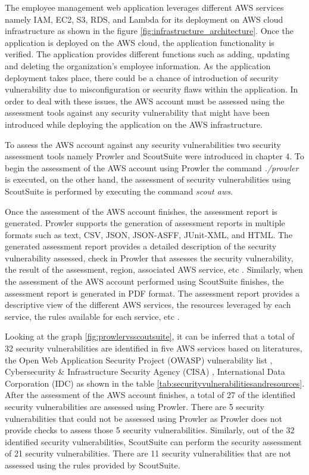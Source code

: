 \par The employee management web application \cite{69} leverages different AWS services namely IAM, EC2, S3, RDS, and Lambda for its deployment on AWS cloud infrastructure as shown in the figure \ref{fig:infrastructure_architecture}.
Once the application is deployed on the AWS cloud, the application functionality is verified.
The application provides different functions such as adding, updating and deleting the organization’s employee information.
As the application deployment takes place, there could be a chance of introduction of security vulnerability due to misconfiguration or security flaws within the application.
In order to deal with these issues, the AWS account must be assessed using the assessment tools against any security vulnerability that might have been introduced while deploying the application on the AWS infrastructure.

\par To assess the AWS account against any security vulnerabilities two security assessment tools namely Prowler and ScoutSuite were introduced in chapter 4.
To begin the assessment of the AWS account using Prowler the command \textit{./prowler} is executed, on the other hand, the assessment of security vulnerabilities using ScoutSuite is performed by executing the command \textit{scout aws}.

\par Once the assessment of the AWS account finishes, the assessment report is generated.
Prowler supports the generation of assessment reports in multiple formats such as text, CSV, JSON, JSON-ASFF, JUnit-XML, and HTML.
The generated assessment report provides a detailed 
description of the security vulnerability assessed, check
in Prowler that assesses the security vulnerability, the result of the assessment, region, associated AWS service, etc \cite{75}.
Similarly, when the assessment of the AWS account performed using ScoutSuite finishes, the assessment report is generated in PDF format.
The assessment report provides a descriptive view of the 
different AWS services, the resources leveraged by each 
service, the rules available for each service, etc \cite{76}.


\par \par Looking at the graph \ref{fig:prowlervsscoutsuite}, it can be inferred that a total of 32 security vulnerabilities are identified in five AWS services based on literatures, the Open Web Application Security Project (OWASP) vulnerability list \cite{43}, Cybersecurity \& Infrastructure Security Agency (CISA) \cite{42}, International Data Corporation (IDC) \cite{41} as shown in the table \ref{tab:securityvulnerabilitiesandresources}.
After the assessment of the AWS account finishes, a total of 27 of the identified security vulnerabilities are assessed using Prowler.
There are 5 security vulnerabilities that could not be assessed using Prowler as Prowler does not provide checks to assess those 5 security vulnerabilities.
Similarly, out of the 32 identified security vulnerabilities, ScoutSuite can perform the security assessment of 21 security vulnerabilities.
There are 11 security vulnerabilities that are not assessed using the rules provided by ScoutSuite.

